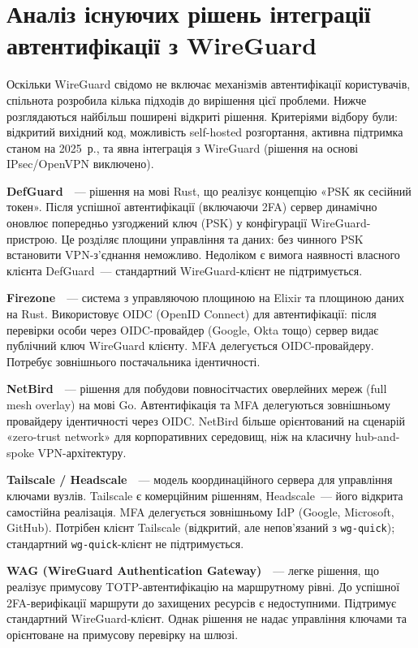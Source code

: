 \section{Аналіз існуючих рішень інтеграції автентифікації з WireGuard}

Оскільки WireGuard свідомо не включає механізмів автентифікації користувачів,
спільнота розробила кілька підходів до вирішення цієї проблеми.
Нижче розглядаються найбільш поширені відкриті рішення.
Критеріями відбору були: відкритий вихідний код, можливість self-hosted
розгортання, активна підтримка станом на 2025~р., та явна інтеграція
з WireGuard (рішення на основі IPsec/OpenVPN виключено).

\textbf{DefGuard}~\cite{defguard2024}~--- рішення на мові Rust, що реалізує
концепцію «PSK як сесійний токен». Після успішної автентифікації (включаючи 2FA)
сервер динамічно оновлює попередньо узгоджений ключ (PSK) у конфігурації
WireGuard-пристрою. Це розділяє площини управління та даних: без чинного PSK
встановити VPN-з'єднання неможливо. Недоліком є вимога наявності власного клієнта
DefGuard~--- стандартний WireGuard-клієнт не підтримується.

\textbf{Firezone}~\cite{firezone2024}~--- система з управляючою площиною на Elixir
та площиною даних на Rust. Використовує OIDC (OpenID Connect) для автентифікації:
після перевірки особи через OIDC-провайдер (Google, Okta тощо) сервер видає
публічний ключ WireGuard клієнту. MFA делегується OIDC-провайдеру.
Потребує зовнішнього постачальника ідентичності.

\textbf{NetBird}~\cite{netbird2024}~--- рішення для побудови повносітчастих
оверлейних мереж (full mesh overlay) на мові Go. Автентифікація та MFA
делегуються зовнішньому провайдеру ідентичності через OIDC.
NetBird більше орієнтований на сценарій «zero-trust network» для корпоративних
середовищ, ніж на класичну hub-and-spoke VPN-архітектуру.

\textbf{Tailscale / Headscale}~\cite{tailscale2024,headscale2024}~--- модель
координаційного сервера для управління ключами вузлів. Tailscale є комерційним
рішенням, Headscale~--- його відкрита самостійна реалізація. MFA делегується
зовнішньому IdP (Google, Microsoft, GitHub). Потрібен клієнт Tailscale
(відкритий, але непов'язаний з \texttt{wg-quick}); стандартний
\texttt{wg-quick}-клієнт не підтримується.

\textbf{WAG (WireGuard Authentication Gateway)}~\cite{wag2024}~--- легке
рішення, що реалізує примусову TOTP-автентифікацію на маршрутному рівні.
До успішної 2FA-верифікації маршрути до захищених ресурсів є недоступними.
Підтримує стандартний WireGuard-клієнт. Однак рішення не надає управління
ключами та орієнтоване на примусову перевірку на шлюзі.

